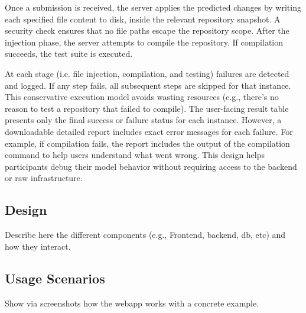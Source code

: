 Once a submission is received, the server applies the predicted changes by writing each specified
file content to disk, inside the relevant repository snapshot. A security check ensures that no file
paths escape the repository scope. After the injection phase, the server attempts to compile the
repository. If compilation succeeds, the test suite is executed.

At each stage (i.e. file injection, compilation, and testing) failures are detected and logged. If
any step fails, all subsequent steps are skipped for that instance. This conservative execution
model avoids wasting resources (e.g., there's no reason to test a repository that failed to
compile). The user-facing result table presents only the final success or failure status for each
instance. However, a downloadable detailed report includes exact error messages for each failure.
For example, if compilation fails, the report includes the output of the compilation command to help
users understand what went wrong. This design helps participants debug their model behavior without
requiring access to the backend or raw infrastructure.

\subsection{Design}

{\color{gray} Describe here the different components (e.g., Frontend, backend, db, etc) and how they
	interact.}

\subsection{Usage Scenarios}

{\color{gray} Show via screenshots how the webapp works with a concrete example.}
\label{sec:refinement} %
\label{sec:paraphrases-check} %
